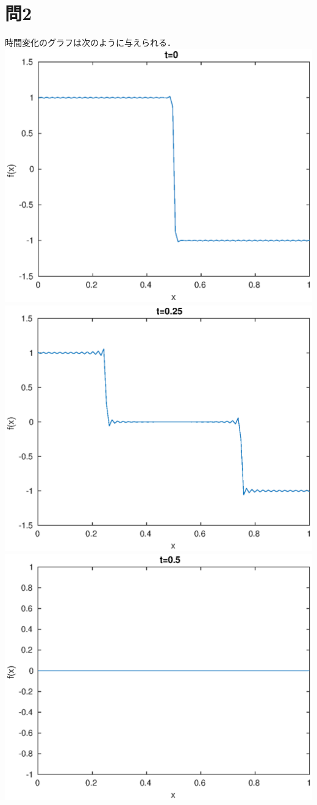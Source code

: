 \documentclass{jreport}
\begin{document}
\section{問2}
時間変化のグラフは次のように与えられる．\\
\includegraphics[scale=0.3]{t0.eps}
\includegraphics[scale=0.3]{t25.eps}
\includegraphics[scale=0.3]{t5.eps}
\end{document}
